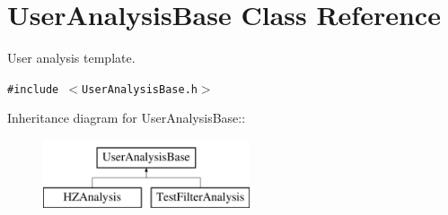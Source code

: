\hypertarget{classUserAnalysisBase}{
\section{User\-Analysis\-Base Class Reference}
\label{classUserAnalysisBase}
}
User analysis template.  


{\tt \#include $<$User\-Analysis\-Base.h$>$}

Inheritance diagram for User\-Analysis\-Base::\begin{figure}[H]
\begin{center}
\leavevmode
\includegraphics[height=2cm]{classUserAnalysisBase}
\end{center}
\end{figure}
